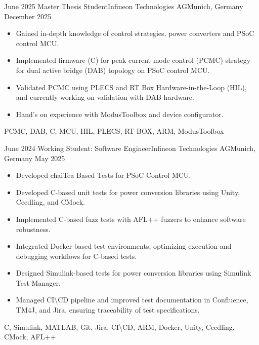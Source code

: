 %
%
%
\begin{experiences}

\experience
    {June 2025}   {Master Thesis Student}{Infineon Technologies AG}{Munich, Germany}
    {December 2025} {
    \begin{itemize}
    \item Gained in-depth knowledge of control strategies, power converters and PSoC control MCU.
    \item Implemented firmware (C) for peak current mode control (PCMC) strategy for dual active bridge (DAB) topology on PSoC control MCU.
    \item Validated PCMC using PLECS and RT Box Hardware-in-the-Loop (HIL), and currently working on validation with DAB hardware.
    \item Hand's on experience with ModusToolbox and device configurator. 
    \end{itemize}
    }
    {PCMC, DAB, C, MCU, HIL, PLECS, RT-BOX, ARM, ModusToolbox}
  \emptySeparator


\experience
    {June 2024}   {Working Student: Software Engineer}{Infineon Technologies AG}{Munich, Germany}
    {May 2025} {
    \begin{itemize}
 \item Developed chaiTea Based Tests for PSoC Control MCU.
 \item Developed C-based unit tests for power conversion libraries using Unity, Ceedling, and CMock.
 \item Implemented C-based fuzz tests with AFL++ fuzzers to enhance software robustness.
 \item Integrated Docker-based test environments, optimizing execution and debugging workflows for C-based tests.
 \item Designed Simulink-based tests for power conversion libraries using Simulink Test Manager.
 \item Managed CI\textbackslash CD pipeline and improved test documentation in Confluence, TM4J, and Jira, ensuring traceability of test specifications.
    \end{itemize}
    }
    {C, Simulink, MATLAB, Git, Jira, CI\textbackslash CD, ARM, Docker, Unity, Ceedling, CMock, AFL++}
  \emptySeparator


\end{experiences}
